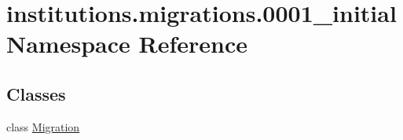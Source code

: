 \hypertarget{namespaceinstitutions_1_1migrations_1_10001__initial}{\section{institutions.\-migrations.0001\-\_\-initial Namespace Reference}
\label{namespaceinstitutions_1_1migrations_1_10001__initial}
}
\subsection*{Classes}
\begin{DoxyCompactItemize}
\item 
class \hyperlink{classinstitutions_1_1migrations_1_10001__initial_1_1_migration}{Migration}
\end{DoxyCompactItemize}
